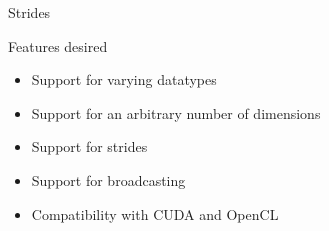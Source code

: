 \documentclass[utf8x,xcolor=pdftex,dvipsnames,table]{beamer}
\begin{document}
\begin{frame}{Strides}
\begin{center}
\end{center}
\end{frame}

\begin{frame}{Features desired}
\begin{itemize}
\item {\color{gray!80} Support for varying datatypes}
\item {\color{gray!80} Support for an arbitrary number of dimensions}
\item {\color{gray!80} Support for strides}
\item Support for broadcasting
\item {\color{gray!80} Compatibility with CUDA and OpenCL}
\end{itemize}
\end{frame}
\end{document}
